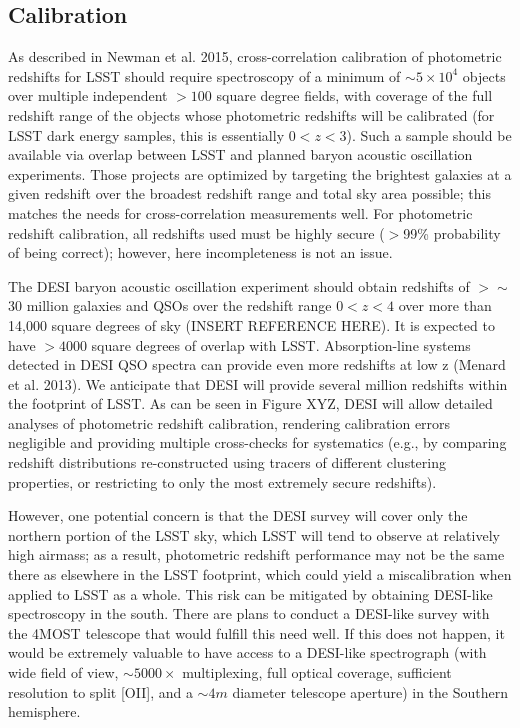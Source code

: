 \subsection{Calibration}

As described in Newman et al. 2015,  cross-correlation calibration of photometric redshifts for LSST should require spectroscopy of a minimum of $\sim 5 \times 10^4$ objects over multiple independent $>100$ square degree fields, with coverage of the full redshift range of the objects whose photometric redshifts will be calibrated (for LSST dark energy samples, this is essentially $0<z<3$).  Such a sample should be available via overlap between LSST and planned baryon acoustic oscillation experiments.  Those projects are optimized by targeting the brightest galaxies at a given redshift over the broadest redshift range and total sky area possible; this matches the needs for cross-correlation measurements well.  For photometric redshift calibration, all redshifts used must be highly secure ($>$99\% probability of being correct); however, here incompleteness is not an issue.

The DESI baryon acoustic oscillation experiment should obtain redshifts of $>\sim$30 million galaxies and QSOs over the redshift range $0 < z < 4$ over more than 14,000 square degrees of sky (INSERT REFERENCE HERE).  It is expected to have $>4000$ square degrees of overlap with LSST.   Absorption-line systems detected in DESI QSO spectra can provide even more redshifts at low z (Menard et al. 2013).  We anticipate that DESI will provide several million redshifts within the footprint of LSST.  As can be seen in Figure XYZ, DESI will allow detailed analyses of photometric redshift calibration, rendering calibration errors negligible and providing multiple cross-checks for systematics (e.g., by comparing redshift distributions re-constructed using tracers of different clustering properties, or restricting to only the most extremely secure redshifts).  

However, one potential concern is that the DESI survey will cover only the northern portion of the LSST sky, which LSST will tend to observe at relatively high airmass; as a result, photometric redshift performance may not be the same there as elsewhere in the LSST footprint, which could yield a miscalibration when applied to LSST as a whole.  This risk can be mitigated by obtaining DESI-like spectroscopy in the south.  There are plans to conduct a DESI-like survey with the 4MOST telescope that would fulfill this need well.  If this does not happen, it would be extremely valuable to have access to a DESI-like spectrograph (with wide field of view, $\sim 5000\times$ multiplexing, full optical coverage, sufficient resolution to split [OII], and a $\sim 4m$ diameter telescope aperture) in the Southern hemisphere.




